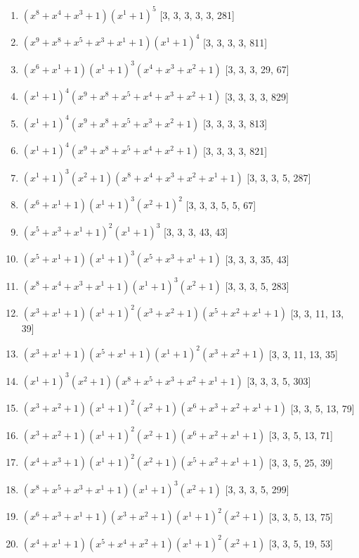 \documentclass[10pt,twocolumn]{article}
\begin{document}
\begin{enumerate}
\item $(x^{8} + x^{4} + x^{3} + 1)(x^{1} + 1)^{5}$  [3, 3, 3, 3, 3, 281]
\item $(x^{9} + x^{8} + x^{5} + x^{3} + x^{1} + 1)(x^{1} + 1)^{4}$  [3, 3, 3, 3, 811]
\item $(x^{6} + x^{1} + 1)(x^{1} + 1)^{3}(x^{4} + x^{3} + x^{2} + 1)$  [3, 3, 3, 29, 67]
\item $(x^{1} + 1)^{4}(x^{9} + x^{8} + x^{5} + x^{4} + x^{3} + x^{2} + 1)$  [3, 3, 3, 3, 829]
\item $(x^{1} + 1)^{4}(x^{9} + x^{8} + x^{5} + x^{3} + x^{2} + 1)$  [3, 3, 3, 3, 813]
\item $(x^{1} + 1)^{4}(x^{9} + x^{8} + x^{5} + x^{4} + x^{2} + 1)$  [3, 3, 3, 3, 821]
\item $(x^{1} + 1)^{3}(x^{2} + 1)(x^{8} + x^{4} + x^{3} + x^{2} + x^{1} + 1)$  [3, 3, 3, 5, 287]
\item $(x^{6} + x^{1} + 1)(x^{1} + 1)^{3}(x^{2} + 1)^{2}$  [3, 3, 3, 5, 5, 67]
\item $(x^{5} + x^{3} + x^{1} + 1)^{2}(x^{1} + 1)^{3}$  [3, 3, 3, 43, 43]
\item $(x^{5} + x^{1} + 1)(x^{1} + 1)^{3}(x^{5} + x^{3} + x^{1} + 1)$  [3, 3, 3, 35, 43]
\item $(x^{8} + x^{4} + x^{3} + x^{1} + 1)(x^{1} + 1)^{3}(x^{2} + 1)$  [3, 3, 3, 5, 283]
\item $(x^{3} + x^{1} + 1)(x^{1} + 1)^{2}(x^{3} + x^{2} + 1)(x^{5} + x^{2} + x^{1} + 1)$  [3, 3, 11, 13, 39]
\item $(x^{3} + x^{1} + 1)(x^{5} + x^{1} + 1)(x^{1} + 1)^{2}(x^{3} + x^{2} + 1)$  [3, 3, 11, 13, 35]
\item $(x^{1} + 1)^{3}(x^{2} + 1)(x^{8} + x^{5} + x^{3} + x^{2} + x^{1} + 1)$  [3, 3, 3, 5, 303]
\item $(x^{3} + x^{2} + 1)(x^{1} + 1)^{2}(x^{2} + 1)(x^{6} + x^{3} + x^{2} + x^{1} + 1)$  [3, 3, 5, 13, 79]
\item $(x^{3} + x^{2} + 1)(x^{1} + 1)^{2}(x^{2} + 1)(x^{6} + x^{2} + x^{1} + 1)$  [3, 3, 5, 13, 71]
\item $(x^{4} + x^{3} + 1)(x^{1} + 1)^{2}(x^{2} + 1)(x^{5} + x^{2} + x^{1} + 1)$  [3, 3, 5, 25, 39]
\item $(x^{8} + x^{5} + x^{3} + x^{1} + 1)(x^{1} + 1)^{3}(x^{2} + 1)$  [3, 3, 3, 5, 299]
\item $(x^{6} + x^{3} + x^{1} + 1)(x^{3} + x^{2} + 1)(x^{1} + 1)^{2}(x^{2} + 1)$  [3, 3, 5, 13, 75]
\item $(x^{4} + x^{1} + 1)(x^{5} + x^{4} + x^{2} + 1)(x^{1} + 1)^{2}(x^{2} + 1)$  [3, 3, 5, 19, 53]

\end{enumerate}
\end{document}
